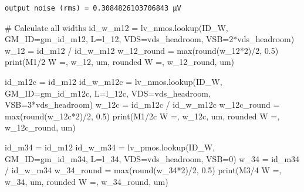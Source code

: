 \documentclass[
  a4paper,
  DIV=11,
  numbers=noendperiod]{scrartcl}
\newenvironment{Shaded}{\begin{snugshade}}{\end{snugshade}}
\newcommand{\BuiltInTok}[1]{\textcolor[rgb]{0.00,0.23,0.31}{#1}}
\newcommand{\CommentTok}[1]{\textcolor[rgb]{0.37,0.37,0.37}{#1}}
\newcommand{\DecValTok}[1]{\textcolor[rgb]{0.68,0.00,0.00}{#1}}
\newcommand{\FloatTok}[1]{\textcolor[rgb]{0.68,0.00,0.00}{#1}}
\newcommand{\NormalTok}[1]{\textcolor[rgb]{0.00,0.23,0.31}{#1}}
\newcommand{\OperatorTok}[1]{\textcolor[rgb]{0.37,0.37,0.37}{#1}}
\newcommand{\StringTok}[1]{\textcolor[rgb]{0.13,0.47,0.30}{#1}}
\begin{document}
\begin{tcolorbox}
\begin{verbatim}
output noise (rms) = 0.3084826103706843 µV
\end{verbatim}

\begin{Shaded}
\begin{Highlighting}[]
\CommentTok{\# Calculate all widths}
\NormalTok{id\_w\_m12 }\OperatorTok{=}\NormalTok{ lv\_nmos.lookup(}\StringTok{\textquotesingle{}ID\_W\textquotesingle{}}\NormalTok{, GM\_ID}\OperatorTok{=}\NormalTok{gm\_id\_m12, L}\OperatorTok{=}\NormalTok{l\_12, VDS}\OperatorTok{=}\NormalTok{vds\_headroom, VSB}\OperatorTok{=}\DecValTok{2}\OperatorTok{*}\NormalTok{vds\_headroom)}
\NormalTok{w\_12 }\OperatorTok{=}\NormalTok{ id\_m12 }\OperatorTok{/}\NormalTok{ id\_w\_m12}
\NormalTok{w\_12\_round }\OperatorTok{=} \BuiltInTok{max}\NormalTok{(}\BuiltInTok{round}\NormalTok{(w\_12}\OperatorTok{*}\DecValTok{2}\NormalTok{)}\OperatorTok{/}\DecValTok{2}\NormalTok{, }\FloatTok{0.5}\NormalTok{)}
\BuiltInTok{print}\NormalTok{(}\StringTok{\textquotesingle{}M1/2  W =\textquotesingle{}}\NormalTok{, w\_12, }\StringTok{\textquotesingle{}um, rounded W =\textquotesingle{}}\NormalTok{, w\_12\_round, }\StringTok{\textquotesingle{}um\textquotesingle{}}\NormalTok{)}

\NormalTok{id\_m12c }\OperatorTok{=}\NormalTok{ id\_m12}
\NormalTok{id\_w\_m12c }\OperatorTok{=}\NormalTok{ lv\_nmos.lookup(}\StringTok{\textquotesingle{}ID\_W\textquotesingle{}}\NormalTok{, GM\_ID}\OperatorTok{=}\NormalTok{gm\_id\_m12c, L}\OperatorTok{=}\NormalTok{l\_12c, VDS}\OperatorTok{=}\NormalTok{vds\_headroom, VSB}\OperatorTok{=}\DecValTok{3}\OperatorTok{*}\NormalTok{vds\_headroom)}
\NormalTok{w\_12c }\OperatorTok{=}\NormalTok{ id\_m12c }\OperatorTok{/}\NormalTok{ id\_w\_m12c}
\NormalTok{w\_12c\_round }\OperatorTok{=} \BuiltInTok{max}\NormalTok{(}\BuiltInTok{round}\NormalTok{(w\_12c}\OperatorTok{*}\DecValTok{2}\NormalTok{)}\OperatorTok{/}\DecValTok{2}\NormalTok{, }\FloatTok{0.5}\NormalTok{)}
\BuiltInTok{print}\NormalTok{(}\StringTok{\textquotesingle{}M1/2c W =\textquotesingle{}}\NormalTok{, w\_12c, }\StringTok{\textquotesingle{}um, rounded W =\textquotesingle{}}\NormalTok{, w\_12c\_round, }\StringTok{\textquotesingle{}um\textquotesingle{}}\NormalTok{)}

\NormalTok{id\_m34 }\OperatorTok{=}\NormalTok{ id\_m12}
\NormalTok{id\_w\_m34 }\OperatorTok{=}\NormalTok{ lv\_pmos.lookup(}\StringTok{\textquotesingle{}ID\_W\textquotesingle{}}\NormalTok{, GM\_ID}\OperatorTok{=}\NormalTok{gm\_id\_m34, L}\OperatorTok{=}\NormalTok{l\_34, VDS}\OperatorTok{=}\NormalTok{vds\_headroom, VSB}\OperatorTok{=}\DecValTok{0}\NormalTok{)}
\NormalTok{w\_34 }\OperatorTok{=}\NormalTok{ id\_m34 }\OperatorTok{/}\NormalTok{ id\_w\_m34}
\NormalTok{w\_34\_round }\OperatorTok{=} \BuiltInTok{max}\NormalTok{(}\BuiltInTok{round}\NormalTok{(w\_34}\OperatorTok{*}\DecValTok{2}\NormalTok{)}\OperatorTok{/}\DecValTok{2}\NormalTok{, }\FloatTok{0.5}\NormalTok{) }
\BuiltInTok{print}\NormalTok{(}\StringTok{\textquotesingle{}M3/4  W =\textquotesingle{}}\NormalTok{, w\_34, }\StringTok{\textquotesingle{}um, rounded W =\textquotesingle{}}\NormalTok{, w\_34\_round, }\StringTok{\textquotesingle{}um\textquotesingle{}}\NormalTok{)}


\end{Highlighting}
\end{Shaded}
\end{tcolorbox}
\end{document}
